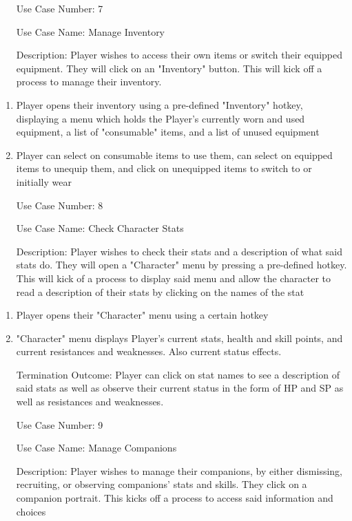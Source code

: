 \documentclass[10pt,conference,onecolumn,compsoc]{IEEEtran}
\begin{document}
\begin{itemize}
\item[Use Case Number:] 7
\item[Use Case Name:] Manage Inventory
\item[Description:] Player wishes to access their own items or switch their equipped equipment. They will click on an "Inventory" button. This will kick off a process to manage their inventory.
\end{itemize}

\begin{enumerate}
\item Player opens their inventory using a pre-defined "Inventory" hotkey, displaying a menu which holds the Player's currently worn and used equipment, a list of "consumable" items, and a list of unused equipment
\item Player can select on consumable items to use them, can select on equipped items to unequip them, and click on unequipped items to switch to or initially wear
\end{enumerate}

\begin{itemize}
\item[Use Case Number:] 8
\item[Use Case Name:] Check Character Stats
\item[Description:] Player wishes to check their stats and a description of what said stats do. They will open a "Character" menu by pressing a pre-defined hotkey. This will kick of a process to display said menu and allow the character to read a description of their stats by clicking on the names of the stat
\end{itemize}

\begin{enumerate}
\item Player opens their "Character" menu using a certain hotkey
\item "Character" menu displays Player's current stats, health and skill points, and current resistances and weaknesses. Also current status effects.
\item [Termination Outcome:] Player can click on stat names to see a description of said stats as well as observe their current status in the form of HP and SP as well as resistances and weaknesses.
\end{enumerate}

\begin{itemize}
\item[Use Case Number:] 9
\item[Use Case Name:] Manage Companions
\item[Description:] Player wishes to manage their companions, by either dismissing, recruiting, or observing companions' stats and skills. They click on a companion portrait. This kicks off a process to access said information and choices
\end{itemize}
\end{document}
